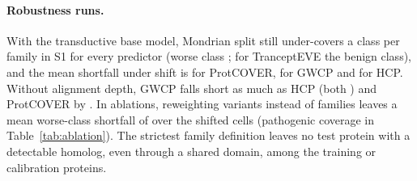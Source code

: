 \paragraph{Robustness runs.} With the transductive base model, Mondrian split still under-covers a class per family in S1 for every predictor (worse class \stdBtwoWorst{}; for TranceptEVE the benign class), and the mean shortfall under shift is \stdShortCrMean{} for ProtCOVER, \stdShortGwcpMean{} for GWCP and \stdShortHcpMean{} for HCP. Without alignment depth, GWCP falls short as much as HCP (both \noMsaShortGwcpMean{}) and ProtCOVER by \noMsaShortCrMean{}. In ablations, reweighting variants instead of families leaves a mean worse-class shortfall of \shortVarWMean{} over the shifted cells (pathogenic coverage in Table~\ref{tab:ablation}). The strictest family definition leaves no test protein with a detectable homolog, even through a shared domain, among the training or calibration proteins.

\begin{table}[h]
\caption{Robustness runs: worse-class shortfall below the 0.90 target at $\alpha=0.1$, mean (maximum) over the \nShiftCells{} shifted cells of each run, class-conditional versions; columns as in Table~\ref{tab:summary}.}
\label{tab:robust}
\centering\setlength{\tabcolsep}{2.5pt}

\end{table}

